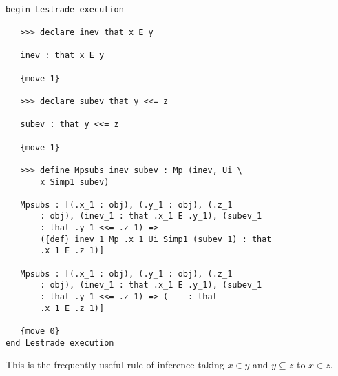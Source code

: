 \documentclass[12pt]{article}
\begin{document}
\begin{verbatim}

begin Lestrade execution

   >>> declare inev that x E y

   inev : that x E y

   {move 1}

   >>> declare subev that y <<= z

   subev : that y <<= z

   {move 1}

   >>> define Mpsubs inev subev : Mp (inev, Ui \
       x Simp1 subev)

   Mpsubs : [(.x_1 : obj), (.y_1 : obj), (.z_1 
       : obj), (inev_1 : that .x_1 E .y_1), (subev_1 
       : that .y_1 <<= .z_1) => 
       ({def} inev_1 Mp .x_1 Ui Simp1 (subev_1) : that 
       .x_1 E .z_1)]

   Mpsubs : [(.x_1 : obj), (.y_1 : obj), (.z_1 
       : obj), (inev_1 : that .x_1 E .y_1), (subev_1 
       : that .y_1 <<= .z_1) => (--- : that 
       .x_1 E .z_1)]

   {move 0}
end Lestrade execution
\end{verbatim}

This is the frequently useful rule of inference taking $x \in y$ and $y \subseteq z$ to $x \in z$.
\end{document}

